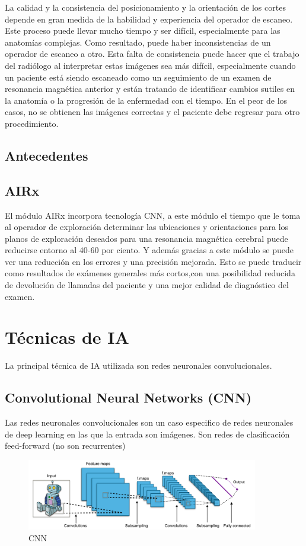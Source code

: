     La calidad y la consistencia del posicionamiento y la orientación de los cortes depende en gran medida de la habilidad y experiencia del operador de escaneo. Este proceso puede llevar mucho tiempo y ser difícil, especialmente para las anatomías complejas. Como resultado, puede haber inconsistencias de un operador de escaneo a otro. Esta falta de consistencia puede hacer que el trabajo del radiólogo al interpretar estas imágenes sea más difícil, especialmente cuando un paciente está siendo escaneado como un seguimiento de un examen de resonancia magnética anterior y están tratando de identificar cambios sutiles en la anatomía o la progresión de la enfermedad con el tiempo. En el peor de los casos, no se obtienen las imágenes correctas y el paciente debe regresar para otro procedimiento.
    \subsection{Antecedentes}
    \subsection{AIRx}
    El módulo AIRx incorpora tecnología CNN, a este módulo el tiempo que le toma al operador de exploración determinar las ubicaciones y orientaciones para los planos de exploración deseados para una resonancia magnética cerebral puede reducirse entorno al 40-60 por ciento. Y además gracias a este módulo se puede ver una reducción en los errores y una precisión mejorada. Esto se puede traducir como  resultados de exámenes generales más cortos,con una posibilidad reducida de devolución de llamadas del paciente y una mejor calidad de diagnóstico del examen.
\section{Técnicas de IA}

    La principal técnica de IA utilizada son redes neuronales convolucionales.

    \subsection{Convolutional Neural Networks (CNN)}
    
    Las redes neuronales convolucionales son un caso especifico de redes neuronales de deep learning
    en las que la entrada son imágenes. Son redes de clasificación feed-forward (no son recurrentes)
    
     \begin{figure}[H]
        \centering
        \includegraphics[width=0.9\textwidth]{cnn}
        \caption{CNN}%
        \label{fig:cnn}
     \end{figure}
    
